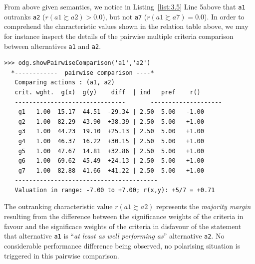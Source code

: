 From above given semantics, we notice in Listing~\ref{list:3.5} Line 5above that \texttt{a1} outranks \texttt{a2} ($r(a1 \succsim a2) > 0.0$), but not \texttt{a7} ($r(a1 \succsim a7) = 0.0$). In order to comprehend the characteristic values shown in the relation table above, we may for instance inspect the details of the pairwise multiple criteria comparison between alternatives \texttt{a1} and \texttt{a2}.
\begin{lstlisting}[caption={Inspecting a pairwise multiple criteria comparison},label=list:3.6]
>>> odg.showPairwiseComparison('a1','a2')
  *------------  pairwise comparison ----*
   Comparing actions : (a1, a2)
   crit. wght.  g(x)  g(y)    diff  | ind   pref    r() 
   -------------------------------  	 --------------------
    g1   1.00  15.17  44.51  -29.34 | 2.50  5.00   -1.00 
    g2   1.00  82.29  43.90  +38.39 | 2.50  5.00   +1.00 
    g3   1.00  44.23  19.10  +25.13 | 2.50  5.00   +1.00 
    g4   1.00  46.37  16.22  +30.15 | 2.50  5.00   +1.00 
    g5   1.00  47.67  14.81  +32.86 | 2.50  5.00   +1.00 
    g6   1.00  69.62  45.49  +24.13 | 2.50  5.00   +1.00 
    g7   1.00  82.88  41.66  +41.22 | 2.50  5.00   +1.00 
   ----------------------------------------
   Valuation in range: -7.00 to +7.00; r(x,y): +5/7 = +0.71
\end{lstlisting}

The outranking characteristic value $r(a1 \succsim a2)$ represents the \emph{majority margin} resulting from the difference between the significance weights of the criteria in favour and the significace weights of the criteria in disfavour of the statement that alternative \texttt{a1} is ``\emph{at least as well performing as}'' alternative \texttt{a2}. No considerable performance difference being observed, no polarising situation is triggered in this pairwise comparison.

